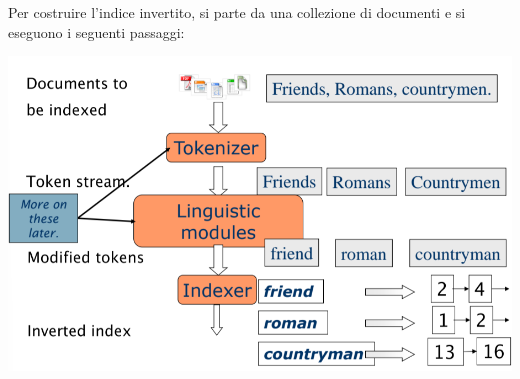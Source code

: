 \documentclass{report}
\begin{document}
	Per costruire l'indice invertito, si parte da una collezione di documenti e si eseguono i seguenti passaggi:
	\begin{center}
		\includegraphics[scale=0.4]{assets/invindexconstr.png}
	\end{center}
\end{document}
